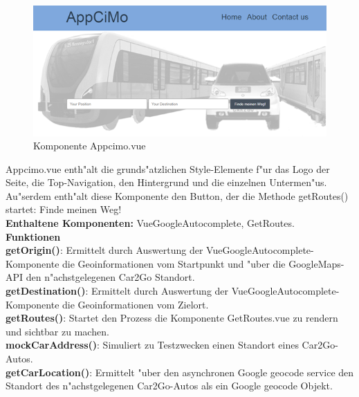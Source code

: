 \documentclass[a4paper, 11pt]{scrreprt}
\begin{document}
\begin{figure} [H]
\begin{center}
\includegraphics[scale=1]{compAppcimo.png}
\caption{Komponente Appcimo.vue}
\label{Appcimo}
\end{center}
\end{figure}

Appcimo.vue enth"alt die grunds"atzlichen Style-Elemente f"ur das Logo der Seite, die Top-Navigation, den Hintergrund und die einzelnen Untermen"us. Au"serdem enth"alt diese Komponente den Button, der die Methode getRoutes() startet: Finde meinen Weg!\\

\textbf{Enthaltene Komponenten:} VueGoogleAutocomplete, GetRoutes. \\

\textbf{Funktionen} \\

\textbf{getOrigin()}: Ermittelt durch Auswertung der VueGoogleAutocomplete-Komponente die Geoinformationen vom Startpunkt und "uber die GoogleMaps-API den n"achstgelegenen Car2Go Standort. \\

\textbf{getDestination()}:  Ermittelt durch Auswertung der VueGoogleAutocomplete-Komponente die Geoinformationen vom Zielort.\\

\textbf{getRoutes()}: Startet den Prozess die Komponente GetRoutes.vue zu rendern und sichtbar zu machen.\\

\textbf{mockCarAddress()}: Simuliert zu Testzwecken einen Standort eines Car2Go-Autos.\\

\textbf{getCarLocation()}: Ermittelt "uber den asynchronen Google geocode service den Standort des n"achstgelegenen Car2Go-Autos als ein Google geocode Objekt.\\
\end{document}
